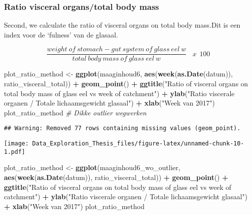 \documentclass[]{article}
\newenvironment{Shaded}{\begin{snugshade}}{\end{snugshade}}
\newcommand{\KeywordTok}[1]{\textcolor[rgb]{0.13,0.29,0.53}{\textbf{#1}}}
\newcommand{\StringTok}[1]{\textcolor[rgb]{0.31,0.60,0.02}{#1}}
\newcommand{\CommentTok}[1]{\textcolor[rgb]{0.56,0.35,0.01}{\textit{#1}}}
\newcommand{\OperatorTok}[1]{\textcolor[rgb]{0.81,0.36,0.00}{\textbf{#1}}}
\newcommand{\NormalTok}[1]{#1}
\begin{document}
\subsubsection{Ratio visceral organs/total body
mass}\label{ratio-visceral-organstotal-body-mass}

Second, we calculate the ratio of visceral organs on total body mass.Dit
is een index voor de `fulness' van de glasaal.

\[ \frac{weight~of~stomach-gut~system~of~glass~eel~w}{total~body~mass~of~glass~eel~w}~~~~ x ~~ 100  \]

\begin{Shaded}
\begin{Highlighting}[]
\NormalTok{plot_ratio_method <-}\StringTok{ }\KeywordTok{ggplot}\NormalTok{(maaginhoud6, }\KeywordTok{aes}\NormalTok{(}\KeywordTok{week}\NormalTok{(}\KeywordTok{as.Date}\NormalTok{(datum)), ratio_visceral_total)) }\OperatorTok{+}
\StringTok{  }\KeywordTok{geom_point}\NormalTok{() }\OperatorTok{+}
\StringTok{  }\KeywordTok{ggtitle}\NormalTok{(}\StringTok{"Ratio of visceral organs on total body mass of glass eel vs week of catchment"}\NormalTok{) }\OperatorTok{+}
\StringTok{  }\KeywordTok{ylab}\NormalTok{(}\StringTok{"Ratio viscerale organen / Totale lichaamsgewicht glasaal"}\NormalTok{) }\OperatorTok{+}
\StringTok{  }\KeywordTok{xlab}\NormalTok{(}\StringTok{"Week van 2017"}\NormalTok{)}
\NormalTok{plot_ratio_method  }\CommentTok{# Dikke outlier wegwerken}
\end{Highlighting}
\end{Shaded}

\begin{verbatim}
## Warning: Removed 77 rows containing missing values (geom_point).
\end{verbatim}

\texttt{[image: Data\_Exploration\_Thesis\_files/figure-latex/unnamed-chunk-10-1.pdf]}

\begin{Shaded}
\begin{Highlighting}[]
\NormalTok{plot_ratio_method <-}\StringTok{ }\KeywordTok{ggplot}\NormalTok{(maaginhoud6_wo_outlier, }\KeywordTok{aes}\NormalTok{(}\KeywordTok{week}\NormalTok{(}\KeywordTok{as.Date}\NormalTok{(datum)), ratio_visceral_total)) }\OperatorTok{+}
\StringTok{  }\KeywordTok{geom_point}\NormalTok{() }\OperatorTok{+}
\StringTok{  }\KeywordTok{ggtitle}\NormalTok{(}\StringTok{"Ratio of visceral organs on total body mass of glass eel vs week of catchment"}\NormalTok{) }\OperatorTok{+}
\StringTok{  }\KeywordTok{ylab}\NormalTok{(}\StringTok{"Ratio viscerale organen / Totale lichaamsgewicht glasaal"}\NormalTok{) }\OperatorTok{+}
\StringTok{  }\KeywordTok{xlab}\NormalTok{(}\StringTok{"Week van 2017"}\NormalTok{)}
\NormalTok{plot_ratio_method }
\end{Highlighting}
\end{Shaded}
\end{document}

